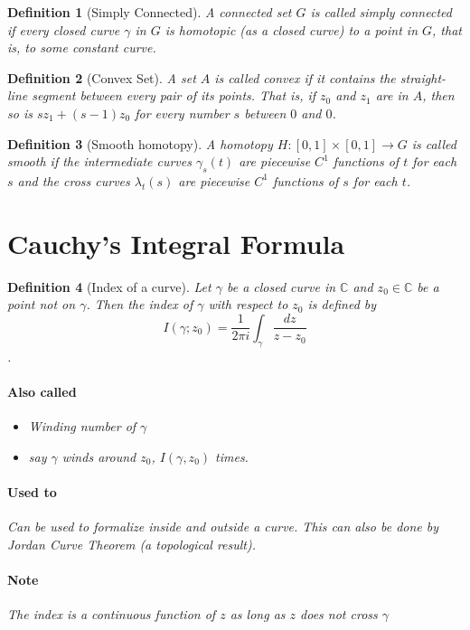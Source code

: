\documentclass[a4paper]{article}
\newtheorem{definition}{Definition}
\newcommand{\C}{\mathbb{C}}
\begin{document}
\begin{definition}[Simply Connected]
  A connected set \(G\) is called simply connected if every closed curve \(\gamma\) in \(G\) is homotopic (as a closed curve) to a point in \(G\), that is, to some constant curve. 
\end{definition}


\begin{definition}[Convex Set]
  A set \(A\) is called convex if it contains the straight-line segment between every pair of its points. 
  That is, if \(z_0\) and \(z_1\) are in \(A\), then so is \(s z_1 + (s - 1) z_0\) for every number \(s\) between \(0\) and \(0\).
\end{definition}

\begin{definition}[Smooth homotopy]
  A homotopy \(H : [0, 1] \times [0, 1] \to G\) is called smooth if the intermediate curves \(\gamma_s(t)\) are piecewise \(C^1\) functions of \(t\) for each \(s\) and the cross curves \(\lambda_t(s)\) are piecewise \(C^1\) functions of \(s\) for each \(t\). 
\end{definition}

\section{Cauchy's Integral Formula}

\begin{definition}[Index of a curve]
Let \(\gamma \) be a closed curve in \(\C\) and \(z_0 \in \C\) be a point not on \(\gamma\). 
Then the index of \(\gamma\) with respect to \(z_0\) is defined by 
\[I(\gamma; z_0) = \frac{1}{2 \pi i} \int_\gamma \frac{dz}{z - z_0} \].

\paragraph{Also called}
\begin{itemize}
  \item Winding number of \(\gamma\)
  \item say \(\gamma \) winds around \(z_0\), \(I(\gamma, z_0) \) times. 
\end{itemize}

\paragraph{Used to}
Can be used to formalize inside and outside a curve. This can also be done by Jordan Curve Theorem (a topological result).

\paragraph{Note}
The index is a continuous function of \(z\) as long as \(z\) does not cross \(\gamma\)

\end{definition}
\end{document}
